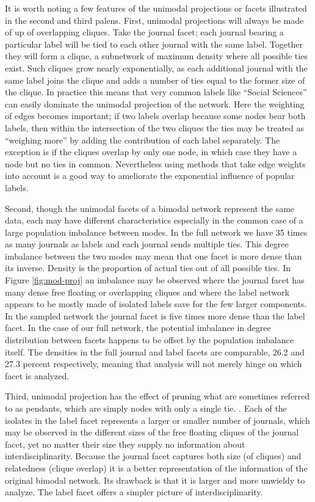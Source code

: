 \documentclass[]{book}
\begin{document}
It is worth noting a few features of the unimodal projections or facets
illustrated in the second and third palens. First, unimodal projections
will always be made of up of overlapping cliques. Take the journal
facet; each journal bearing a particular label will be tied to each
other journal with the same label. Together they will form a clique, a
subnetwork of maximum density where all possible ties exist. Such
cliques grow nearly exponentially, as each additional journal with the
same label joins the clique and adds a number of ties equal to the
former size of the clique. In practice this means that very common
labels like ``Social Sciences'' can easily dominate the unimodal
projection of the network. Here the weighting of edges becomes
important; if two labels overlap because some nodes bear both labels,
then within the intersection of the two cliques the ties may be treated
as ``weighing more'' by adding the contribution of each label
separately. The exception is if the cliques overlap by only one node, in
which case they have a node but no ties in common. Nevertheless using
methods that take edge weights into account is a good way to ameliorate
the exponential influence of popular labels.

Second, though the unimodal facets of a bimodal network represent the
same data, each may have different characteristics especially in the
common case of a large population imbalance between modes. In the full
network we have 35 times as many journals as labels and each journal
sends multiple ties. This degree imbalance between the two modes may
mean that one facet is more dense than its inverse. Density is the
proportion of actual ties out of all possible ties. In Figure
\ref{fig:mod-proj} an imbalance may be observed where the journal facet
has many dense free floating or overlapping cliques and where the label
network appears to be mostly made of isolated labels save for the few
larger components. In the sampled network the journal facet is five
times more dense than the label facet. In the case of our full network,
the potential imbalance in degree distribution between facets happens to
be offset by the population imbalance itself. The densities in the full
journal and label facets are comparable, 26.2 and 27.3 percent
respectively, meaning that analysis will not merely hinge on which facet
is analyzed.

Third, unimodal projection has the effect of pruning what are sometimes
referred to as pendants, which are simply nodes with only a single tie.
. Each of the isolates in the label facet represents a larger or smaller
number of journals, which may be observed in the different sizes of the
free floating cliques of the journal facet, yet no matter their size
they supply no information about interdisciplinarity. Because the
journal facet captures both size (of cliques) and relatedness (clique
overlap) it is a better representation of the information of the
original bimodal network. Its drawback is that it is larger and more
unwieldy to analyze. The label facet offers a simpler picture of
interdisciplinarity.
\end{document}
